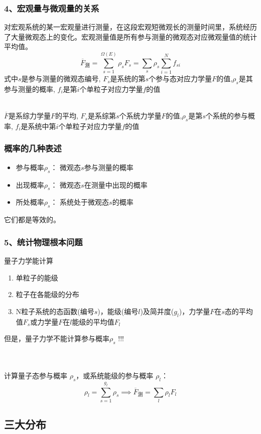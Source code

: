 \begin{frame}
  \frametitle{ 4、宏观量与微观量的关系}
  对宏观系统的某一宏观量进行测量，在这段宏观短微观长的测量时间里，系统经历了大量微观态上的变化。宏观测量值是所有参与测量的微观态对应微观量值的统计平均值。
  \[ \overline{F}_{\text{测}} = \sum _{s=1}^{\Omega(E)} \rho _s F_s = \sum _{s} \rho _s \sum _{i=1}^N f_{si} \]
  \emf[参与态表述：] 式中$s$是参与测量的微观态编号, $F_s$是系统的第$s$个参与态对应力学量$F$的值,$\rho _s$是其参与测量的概率, $f_i$是第$i$个单粒子对应力学量$f$的值

  ~~\\ 
  \emf[系综表述：] $\overline{F}$是系综力学量$F$的平均, $F_s$是系综第$s$个系统力学量$F$的值,$\rho _s$是第$s$个系统的参与概率, $f_i$是系统中第$i$个单粒子对应力学量$f$的值
\end{frame} 

\begin{frame}
  \frametitle{概率的几种表述}
  \begin{itemize}
    \item 参与概率$\rho _s$： 微观态$s$参与测量的概率
    \item 出现概率$\rho _s$： 微观态$s$在测量中出现的概率
    \item 所处概率$\rho _s$： 系统处于微观态$s$的概率
  \end{itemize}
  它们都是等效的。
\end{frame} 

\begin{frame}
  \frametitle{ 5、统计物理根本问题}
  量子力学能计算
  \begin{enumerate}
    \item 单粒子的能级
    \item 粒子在各能级的分布
    \item N粒子系统的态函数(编号$s$)，能级(编号$l$)及简并度($g_l$)，力学量$F$在$s$态的平均值$F_s$或力学量$F$在$l$能级的平均值$F_l$
  \end{enumerate}
  但是，量子力学不能计算参与概率$\rho _s$ !!!
    
  ~~\\ 
  \emf[统计物理的第一要务:]  \\
  计算量子态参与概率 $\rho _s$，或系统能级的参与概率 $\rho _l$： $$ \rho _l = \sum_{s=1}^{g_l} \rho _s \implies \overline{F}_{\text{测}} = \sum _{l} \rho _l F_l $$
\end{frame} 

\subsection{三大分布}

